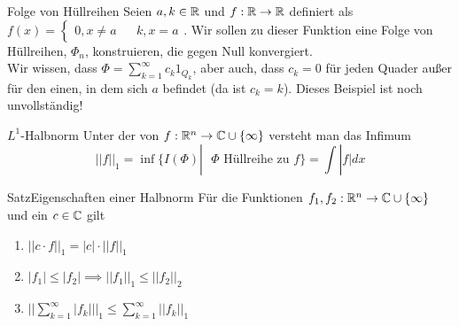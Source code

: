 \begin{Beispiel}{Folge von Hüllreihen}
Seien $a, k\in \mathbb{R}$ und $f:\mathbb{R}\rightarrow\mathbb{R}$ definiert als $f(x)=\begin{cases}0, x\neq a && k, x=a\end{cases}$. Wir sollen zu dieser Funktion eine Folge von Hüllreihen, $\Phi_n$, konstruieren, die gegen Null konvergiert. \\
Wir wissen, dass $\Phi = \sum_{k=1}^\infty c_k 1_{Q_k}$, aber auch, dass $c_k=0$ für jeden Quader außer für den einen, in dem sich $a$ befindet (da ist $c_k=k$).
 Dieses Beispiel ist noch unvollständig!
\end{Beispiel}
\begin{Def}{$L^1$-Halbnorm}
Unter der  von $f:\mathbb{R}^n\rightarrow\mathbb{C}\cup \{\infty\}$ versteht man das Infimum
$$||f||_1=\inf\{I(\Phi) |\mbox{ $\Phi$ Hüllreihe zu $f$} \}=\int |f|dx$$
\end{Def}
\begin{Satz}{Satz}{Eigenschaften einer Halbnorm}
Für die Funktionen $f_1, f_2: \mathbb{R}^n\rightarrow \mathbb{C}\cup\{\infty\}$ und ein $c\in\mathbb{C}$ gilt
\begin{enumerate}
\item $||c\cdot f||_1 = |c|\cdot ||f||_1$
\item $|f_1| \leq |f_2|  \implies ||f_1||_1 \leq ||f_2||_2$
\item $||\sum_{k=1}^\infty |f_k| ||_1\leq \sum_{k=1}^\infty ||f_k||_1$
\end{enumerate}
\end{Satz}
